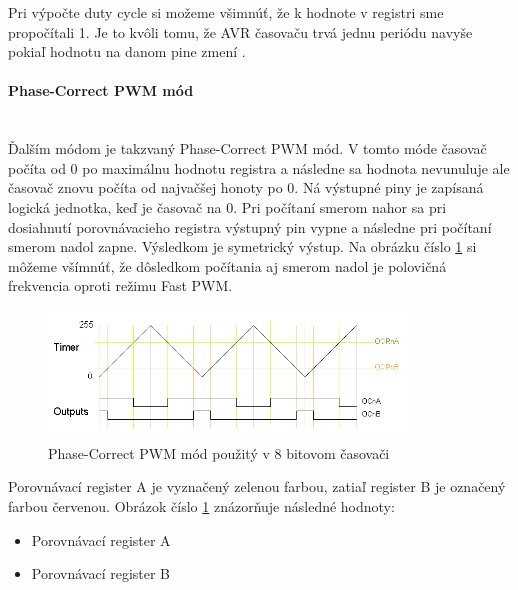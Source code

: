 Pri výpočte  duty cycle si možeme všimnúť, že k hodnote v registri sme propočítali 1. Je to kvôli tomu, že AVR časovaču trvá jednu periódu navyše pokiaľ hodnotu
na danom pine zmení \cite{shirriffSecretsArduinoPWM}.
\paragraph{Phase-Correct PWM mód} \mbox{}\\
Ďalším módom je takzvaný Phase-Correct PWM mód. V tomto móde časovač počíta od 0 po maximálnu hodnotu registra a následne sa hodnota nevunuluje
ale časovač znovu počíta od najvačšej honoty po 0. Ná výstupné piny je zapísaná logická jednotka, keď je časovač na 0. Pri počítaní smerom nahor sa pri dosiahnutí porovnávacieho registra výstupný pin vypne
a následne pri počítaní smerom nadol zapne. Výsledkom je symetrický výstup. Na obrázku  číslo \ref{figure:phase-correct-pwm-mode} si môžeme všímnúť,
že dôsledkom počítania aj smerom nadol je polovičná frekvencia oproti režimu Fast PWM.

\begin{figure}[!h]
    \centering
    \includegraphics[width=0.85\textwidth]{img/phase-correct.png}
    \caption{Phase-Correct PWM mód použitý v 8 bitovom časovači}
    \label{figure:phase-correct-pwm-mode}
\end{figure}

Porovnávací register A je vyznačený zelenou farbou, zatiaľ register B je označený farbou červenou. Obrázok číslo \ref{figure:phase-correct-pwm-mode} znázorňuje následné hodnoty:
\begin{itemize}
    \item Porovnávací register A
    \item Porovnávací register B
\end{itemize}